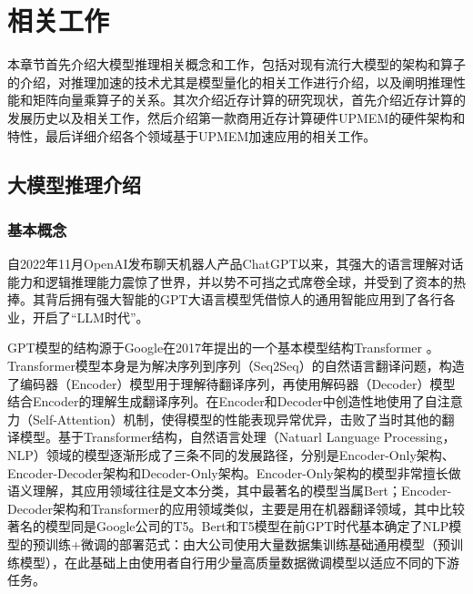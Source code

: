 \chapter{相关工作}

本章节首先介绍大模型推理相关概念和工作，包括对现有流行大模型的架构和算子的介绍，对推理加速的技术尤其是模型量化的相关工作进行介绍，以及阐明推理性能和矩阵向量乘算子的关系。其次介绍近存计算的研究现状，首先介绍近存计算的发展历史以及相关工作，然后介绍第一款商用近存计算硬件UPMEM的硬件架构和特性，最后详细介绍各个领域基于UPMEM加速应用的相关工作。

\section{大模型推理介绍}

\subsection{基本概念}
自2022年11月OpenAI发布聊天机器人产品ChatGPT以来，其强大的语言理解对话能力和逻辑推理能力震惊了世界，并以势不可挡之式席卷全球，并受到了资本的热捧。其背后拥有强大智能的GPT大语言模型凭借惊人的通用智能应用到了各行各业，开启了“LLM时代”。

GPT模型的结构源于Google在2017年提出的一个基本模型结构Transformer \cite{Transformer}。Transformer模型本身是为解决序列到序列（Seq2Seq）的自然语言翻译问题，构造了编码器（Encoder）模型用于理解待翻译序列，再使用解码器（Decoder）模型结合Encoder的理解生成翻译序列。在Encoder和Decoder中创造性地使用了自注意力（Self-Attention）机制，使得模型的性能表现异常优异，击败了当时其他的翻译模型。基于Transformer结构，自然语言处理（Natuarl Language Processing，NLP）领域的模型逐渐形成了三条不同的发展路径，分别是Encoder-Only架构、Encoder-Decoder架构和Decoder-Only架构。Encoder-Only架构的模型非常擅长做语义理解，其应用领域往往是文本分类，其中最著名的模型当属Bert\cite{Bert}；Encoder-Decoder架构和Transformer的应用领域类似，主要是用在机器翻译领域，其中比较著名的模型同是Google公司的T5\cite{T5}。Bert和T5模型在前GPT时代基本确定了NLP模型的预训练+微调的部署范式：由大公司使用大量数据集训练基础通用模型（预训练模型），在此基础上由使用者自行用少量高质量数据微调模型以适应不同的下游任务。

